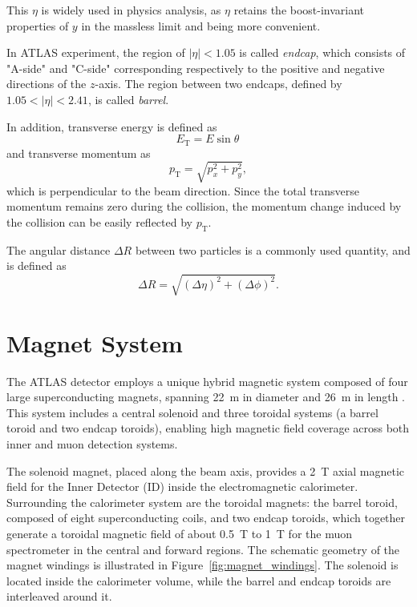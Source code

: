 This \(\eta\) is widely used in physics analysis, as \(\eta\) retains the boost-invariant properties of \(y\) in the massless limit and being more convenient. 

In ATLAS experiment, the region of $|\eta| < 1.05$ is called \textit{endcap}, which consists of "A-side" and "C-side" corresponding respectively to the positive and negative directions of the \(z\)-axis. The region between two endcaps, defined by $1.05 < |\eta| < 2.41$, is called \textit{barrel}.

In addition, transverse energy is defined as 
\[
  E_{\mathrm{T}} = E \sin \theta\,
\]
and transverse momentum as
\[
  p_{\mathrm{T}} = \sqrt{p_x^2 + p_y^2},
\]
which is perpendicular to the beam direction. Since the total transverse momentum remains zero during the collision, the momentum change induced by the collision can be easily reflected by \(p_{\mathrm{T}}\).

The angular distance \(\Delta R\) between two particles is a commonly used quantity, and is defined as
\begin{equation}
  \Delta R = \sqrt{(\Delta \eta)^2 + (\Delta \phi)^2}.
  \label{eq:deltaR}
\end{equation}
\section{Magnet System} \label{sec:MagnetSystem}
The ATLAS detector employs a unique hybrid magnetic system composed of four large superconducting magnets, spanning 22~m in diameter and 26~m in length \cite{ATLASDetector2008}. This system includes a central solenoid and three toroidal systems (a barrel toroid and two endcap toroids), enabling high magnetic field coverage across both inner and muon detection systems.

The solenoid magnet, placed along the beam axis, provides a 2~T axial magnetic field for the Inner Detector (ID) inside the electromagnetic calorimeter. Surrounding the calorimeter system are the toroidal magnets: the barrel toroid, composed of eight superconducting coils, and two endcap toroids, which together generate a toroidal magnetic field of about 0.5~T to 1~T for the muon spectrometer in the central and forward regions. The schematic geometry of the magnet windings is illustrated in Figure~\ref{fig:magnet_windings}. The solenoid is located inside the calorimeter volume, while the barrel and endcap toroids are interleaved around it. 


